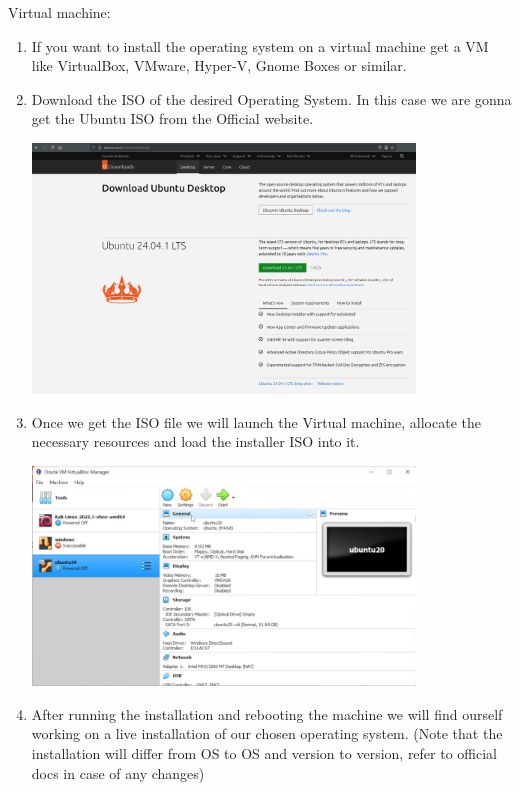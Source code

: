 \documentclass[12pt,letterpaper]{article}
\begin{document}
Virtual machine:
\begin{enumerate}
  \item If you want to install the operating system on a virtual machine get a VM like VirtualBox, VMware, Hyper-V, Gnome Boxes or similar. 
  \item Download the ISO of the desired Operating System. In this case we are gonna get the Ubuntu ISO from the Official website. 
    \begin{center}
      \includegraphics[width=0.8\textwidth]{screens/Pasted Image.png}
    \end{center}
  \item Once we get the ISO file we will launch the Virtual machine, allocate the necessary resources and load the installer ISO into it. 
    \begin{center}
      \includegraphics[width=0.8\textwidth]{screens/Pasted image (2).png}
    \end{center}
  \item After running the installation and rebooting the machine we will find ourself working on a live installation of our chosen operating system. 
    (Note that the installation will differ from OS to OS and version to version, refer to official docs in case of any changes)
    \begin{center}

\end{center}
\end{enumerate}
\end{document}
